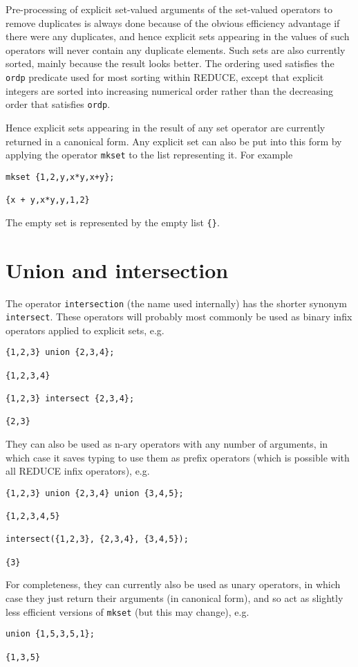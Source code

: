 Pre-processing of explicit set-valued arguments of the set-valued
operators to remove duplicates is always done because of the obvious
efficiency advantage if there were any duplicates, and hence explicit
sets appearing in the values of such operators will never contain any
duplicate elements.  Such sets are also currently sorted, mainly
because the result looks better.  The ordering used satisfies the {\tt
ordp} predicate used for most sorting within REDUCE, except that
explicit integers are sorted into increasing numerical order rather
than the decreasing order that satisfies {\tt ordp}.

Hence explicit sets appearing in the result of any set operator are
currently returned in a canonical form.  Any explicit set can also be
put into this form by applying the operator {\tt mkset} to the list
representing it.  For example
\begin{verbatim}
mkset {1,2,y,x*y,x+y};

{x + y,x*y,y,1,2}
\end{verbatim}

The empty set is represented by the empty list \verb|{}|.


\section{Union and intersection}

The operator {\tt intersection} (the name used internally) has the
shorter synonym {\tt intersect}.  These operators will probably most
commonly be used as binary infix operators applied to explicit sets,
e.g.
\begin{verbatim}
{1,2,3} union {2,3,4};

{1,2,3,4}

{1,2,3} intersect {2,3,4};

{2,3}
\end{verbatim}
They can also be used as n-ary operators with any number of arguments,
in which case it saves typing to use them as prefix operators (which
is possible with all REDUCE infix operators), e.g.
\begin{verbatim}
{1,2,3} union {2,3,4} union {3,4,5};

{1,2,3,4,5}

intersect({1,2,3}, {2,3,4}, {3,4,5});

{3}
\end{verbatim}
For completeness, they can currently also be used as unary operators,
in which case they just return their arguments (in canonical form),
and so act as slightly less efficient versions of {\tt mkset} (but
this may change), e.g.
\begin{verbatim}
union {1,5,3,5,1};

{1,3,5}
\end{verbatim}


